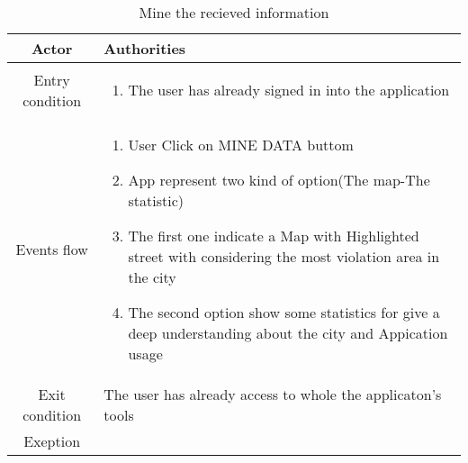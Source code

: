 \documentclass{article}
\begin{document}
		
			\begin{table} [H]
		\begin{center}
		\caption{Mine the recieved information}
		\begin{tabular}{|c|p{8cm}|}
			\hline
			Actor&Authorities\\
			\hline
			Entry condition&
				\begin{enumerate}
					\item The user has already signed in into the application
				\end{enumerate}\\
			\hline
			 Events flow&
			\begin{enumerate}
			\item User Click on MINE DATA buttom 			
			\item App represent two kind of option(The map-The statistic)
			\item The first one indicate a Map with Highlighted street with considering the most violation area in the city
			\item The second option show some statistics for give a deep understanding about the city and Appication usage
			\end{enumerate}\\
			\hline
			Exit condition& The user has already access to whole the applicaton's tools\\
			\hline
			Exeption&
		\\
			\hline
		\end{tabular}
				
		\end{center}


		\end{table} 
\end{document}

